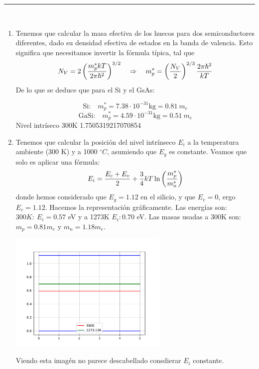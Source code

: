 \rule{\textwidth}{0.1pt} \\[2pt]


\begin{enumerate}[label=\alph*)]
	\item	Tenemos que calcular la masa efectiva de los huecos para dos semiconductores diferentes, dado su densidad efectiva de estados en la banda de valencia. Esto significa que necesitamos invertir la fórmula típica, tal que
		  \begin{equation}
			  N_V = 2 \left( \frac{m_p^* kT}{2\pi\hbar^2} \right)^{3/2} \quad \Rightarrow \quad m_p^* = \left( \frac{N_V}{2} \right)^{2/3} {\frac{2 \pi \hbar^2}{kT}}
		  \end{equation}
		  De lo que se deduce que para el Si y el GsAs:

		  \begin{equation}
			  \text{Si:} \quad m_p^* = 7.38\cdot10^{-31} \text{kg} = 0.81 \ {m}_e
		  \end{equation}
		  \begin{equation}
			  \text{GaSi:}\quad m_p^* = 4.59 \cdot10^{-31} \text{kg} = 0.51 \ {m}_e
		  \end{equation}
		  Nivel intríseco 300K 1.7505319217070854
	\item Tenemos que calcular la posición del nivel intrínseco $E_i$ a la temperatura ambiente (300 K) y a 1000 $^\circ C$, asumiendo que $E_g$ es constante. Veamos que solo es aplicar una fórmula:
		  \begin{equation}
			  E_i = \frac{E_c+E_v}{2} + \frac{3}{4} kT \ln\left( \frac{m_p^*}{m_n^*} \right)
		  \end{equation}
		  donde hemos considerado que $E_g=1.12$ en el silicio, y que $E_v=0$, ergo $E_c=1.12$. Hacemos la representación gráficamente. Las energías son: $300K: \ E_i=0.57$ eV y a 1273K $E_i: 0.70$ eV. Las masas usadas a 300K son: $m_p=0.81m_e$ y $m_n=1.18m_e$.
		  \begin{center}
			  \includegraphics[width=0.6\textwidth]{Cuerpo/Ch_01/Ejercicio_01_5.pdf}
		  \end{center}
		  Viendo esta imagén no parece descabellado consdierar $E_i$ constante.
\end{enumerate}


